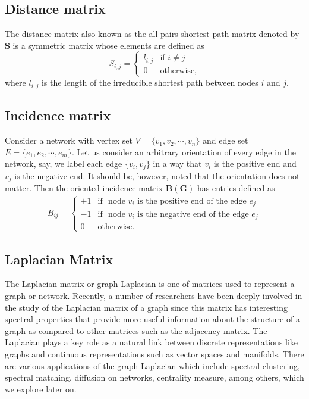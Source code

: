 \documentclass[10pt,a4paper]{article}
\begin{document}
\subsection{Distance matrix}
The distance matrix also known as the all-pairs shortest path matrix denoted by $\mathbf{S}$ is a symmetric matrix whose elements are defined as 
\begin{equation}
	S_{i,j} =  \begin{cases} l_{i,j} &\mbox{if } i \neq j \\
0 & \text{otherwise},
\end{cases}
\end{equation}
where $l_{i,j}$ is the length of the irreducible shortest path between nodes $i$ and $j$.

\subsection{Incidence matrix}
	Consider a network with vertex set $V=\{v_1,v_2, \cdots,v_n\}$ and edge set $E =\{e_1,e_2,\cdots,e_m \}$. Let us consider an arbitrary orientation of every edge in the network, say, we label each edge $\{v_i,v_j\}$ in a way that $v_i$ is the positive end and $v_j$ is the negative end. It should be, however, noted that the orientation does not matter. Then the oriented incidence matrix $\mathbf{B(G)}$ has entries defined as
	\begin{eqnarray}
	B_{ij} = \begin{cases} +1 &\mbox{if } \text{ node $v_i$ is the positive end of the edge } e_j \\
	-1 &\mbox{if }  \text{ node $v_i$ is the negative end of the edge } e_j\\
	0 & \text{otherwise}.
	\end{cases}
	\end{eqnarray}

\subsection{Laplacian Matrix}
The Laplacian matrix or graph Laplacian is one of matrices used to represent a graph or network. Recently, a number of researchers have been deeply involved in the study of the Laplacian matrix of a graph since this matrix has interesting spectral properties that provide more useful information about the structure of a graph as compared to other matrices such as the adjacency matrix. The Laplacian plays a key role as a natural link between discrete representations like graphs and continuous representations such as vector spaces and manifolds. 
There are various applications of the graph Laplacian which include spectral clustering, spectral matching, diffusion on networks, centrality measure, among others, which we explore later on. 
\end{document}
